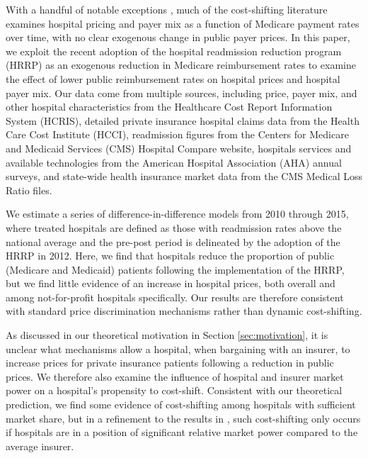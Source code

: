 \documentclass[12pt]{article}
\begin{document}
With a handful of notable exceptions \citep{dranove1988,dranove1998,wu2010,dranove2017}, much of the cost-shifting literature examines hospital pricing and payer mix as a function of Medicare payment rates over time, with no clear exogenous change in public payer prices. In this paper, we exploit the recent adoption of the hospital readmission reduction program (HRRP) as an exogenous reduction in Medicare reimbursement rates to examine the effect of lower public reimbursement rates on hospital prices and hospital payer mix. Our data come from multiple sources, including price, payer mix, and other hospital characteristics from the Healthcare Cost Report Information System (HCRIS), detailed private insurance hospital claims data from the Health Care Cost Institute (HCCI), readmission figures from the Centers for Medicare and Medicaid Services (CMS) Hospital Compare website, hospitals services and available technologies from the American Hospital Association (AHA) annual surveys, and state-wide health insurance market data from the CMS Medical Loss Ratio files.

We estimate a series of difference-in-difference models from 2010 through 2015, where treated hospitals are defined as those with readmission rates above the national average and the pre-post period is delineated by the adoption of the HRRP in 2012. Here, we find that hospitals reduce the proportion of public (Medicare and Medicaid) patients following the implementation of the HRRP, but we find little evidence of an increase in hospital prices, both overall and among not-for-profit hospitals specifically. Our results are therefore consistent with standard price discrimination mechanisms rather than dynamic cost-shifting.

As discussed in our theoretical motivation in Section \ref{sec:motivation}, it is unclear what mechanisms allow a hospital, when bargaining with an insurer, to increase prices for private insurance patients following a reduction in public prices. We therefore also examine the influence of hospital and insurer market power on a hospital's propensity to cost-shift. Consistent with our theoretical prediction, we find some evidence of cost-shifting among hospitals with sufficient market share, but in a refinement to the results in \cite{dranove2017}, such cost-shifting only occurs if hospitals are in a position of significant relative market power compared to the average insurer.
\end{document}
